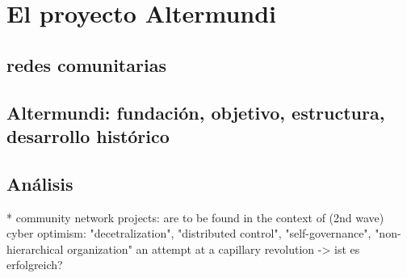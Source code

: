 \section{El proyecto Altermundi}

\subsection{redes comunitarias}
\begin{comment}
* infraestructura de comunicación decentralizada creada y mantenida por la comunidad de lxs usuarixs
* garantizar acceso libre a información
* garantizar la libertad de expresión
\end{comment}

\subsection{Altermundi: fundación, objetivo, estructura, desarrollo histórico}
\begin{comment}
* existe en su forma actual desde 2012
* objetivo: facilitar la construcción y el mantenimiento de redes comunitarias inalámbricas
* grupo básico de activistas + redes locales autónomas
* educar y concienciar: talleres, empoderamiento, el grupo central en papel consultativo
* la comunidad decide
\end{comment}


\subsection{Análisis}
* community network projects: are to be found in the context of (2nd wave) cyber optimism: "decetralization", "distributed control", "self-governance", "non-hierarchical organization"
an attempt at a capillary revolution -> ist es erfolgreich?
\begin{comment}
> framing the Internet alternately as lawless, anarchic,
> free, “a world where anyone, anywhere may express his or her beliefs, no matter how singular,
> without fear of being coerced into silence or conformity” (Barlow 1996) (p.1)

* la infraestructura está prerequisito para participación

## Conclusión del texto [Rieder2012]

> If technology won’t deliver us from the conundrums of
> governance, negotiation, and struggle, we
> may as well reengage politics proper[ly].

* sobre todo problemas sociales/políticos: organización de grupos (no tanto técnicos): ¿cómo decidimos como grupo? ¿quién hace qué? ¿quién está responsable?
* soluciones políticas para problemas políticos

\end{comment}

